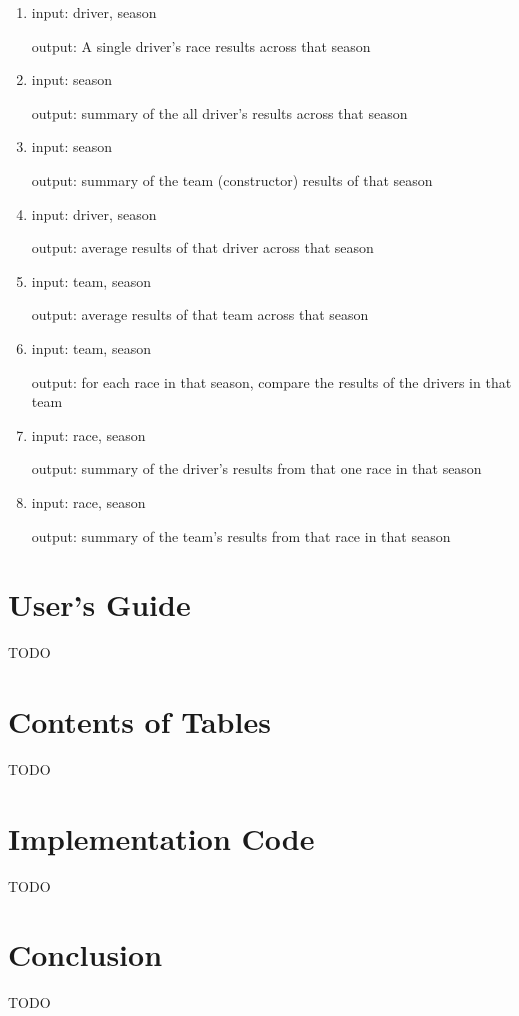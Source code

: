 \documentclass{article} %
\begin{document}
\begin{enumerate}[label=(\arabic*)]
    \item %
    input: driver, season

    output: A single driver's race results across that season 

    \item %
    input: season

    output: summary of the all driver's results across that season

    \item %
    input: season

    output: summary of the team (constructor) results of that season

    \item %
    input: driver, season

    output: average results of that driver across that season

    \item %
    input: team, season

    output: average results of that team across that season

    \item %
    input: team, season 

    output: for each race in that season, compare the results of the
    drivers in that team

    \item %
    input: race, season 
    
    output: summary of the driver's results from that one race in that season

    \item %
    input: race, season 
    
    output: summary of the team's results from that race in that season

\end{enumerate}


\section{User's Guide}

TODO

\section{Contents of Tables}

TODO

\section{Implementation Code}

TODO

\section{Conclusion}

TODO
\end{document}
